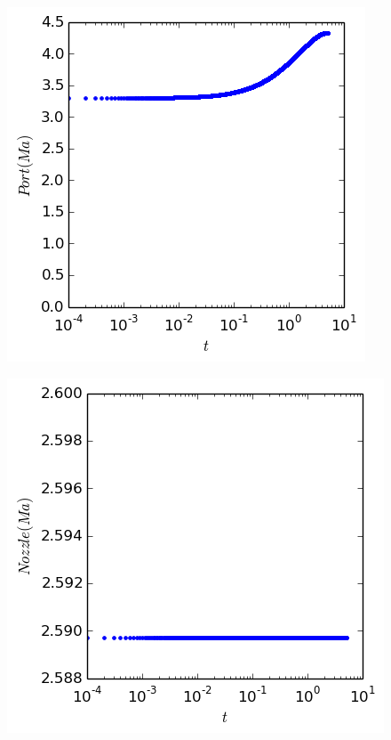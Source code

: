 \documentclass[cleanfoot,cleanhead,twocolumn,10pt,notitlepage]{asme2e}
\begin{document}
\includegraphics[width=\linewidth]{../python_stuff/Part2/PortMach.png}

\includegraphics[width=\linewidth]{../python_stuff/Part2/NozzMach.png}
\end{document}
